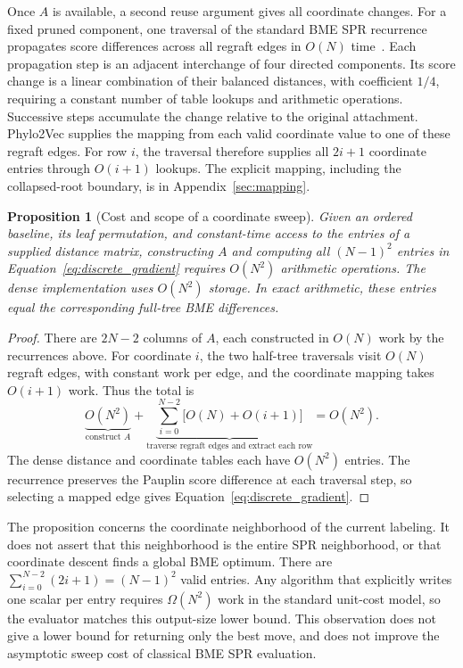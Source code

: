 \documentclass[11pt,a4paper]{article}
\makeatletter
\DeclareRobustCommand{\_}{\ifmmode\nfss@text{\textunderscore}\else\textunderscore\allowbreak\fi}
\newtheorem{proposition}[theorem]{Proposition}
\theoremstyle{definition}
\makeatother
\begin{document}
Once $A$ is available, a second reuse argument gives all coordinate changes.
For a fixed pruned component, one traversal of the standard BME SPR recurrence propagates score differences across all regraft edges in $O(N)$ time~\cite{hordijk2005spr}.
Each propagation step is an adjacent interchange of four directed components.
Its score change is a linear combination of their balanced distances, with coefficient $1/4$, requiring a constant number of table lookups and arithmetic operations.
Successive steps accumulate the change relative to the original attachment.
Phylo2Vec supplies the mapping from each valid coordinate value to one of these regraft edges.
For row $i$, the traversal therefore supplies all $2i+1$ coordinate entries through $O(i+1)$ lookups.
The explicit mapping, including the collapsed-root boundary, is in Appendix~\ref{sec:mapping}.

\begin{proposition}[Cost and scope of a coordinate sweep]
\label{prop:quadratic}
Given an ordered baseline, its leaf permutation, and constant-time access to the entries of a supplied distance matrix, constructing $A$ and computing all $(N-1)^2$ entries in Equation~\eqref{eq:discrete_gradient} requires $O(N^2)$ arithmetic operations.
The dense implementation uses $O(N^2)$ storage.
In exact arithmetic, these entries equal the corresponding full-tree BME differences.
\end{proposition}
\begin{proof}
There are $2N-2$ columns of $A$, each constructed in $O(N)$ work by the recurrences above.
For coordinate $i$, the two half-tree traversals visit $O(N)$ regraft edges, with constant work per edge, and the coordinate mapping takes $O(i+1)$ work.
Thus the total is
\[
 \underbrace{O(N^2)}_{\text{construct }A}
 +\underbrace{\sum_{i=0}^{N-2}\bigl[O(N)+O(i+1)\bigr]}_{\text{traverse regraft edges and extract each row}}
 =O(N^2).
\]
The dense distance and coordinate tables each have $O(N^2)$ entries.
The recurrence preserves the Pauplin score difference at each traversal step, so selecting a mapped edge gives Equation~\eqref{eq:discrete_gradient}.
\end{proof}

The proposition concerns the coordinate neighborhood of the current labeling.
It does not assert that this neighborhood is the entire SPR neighborhood, or that coordinate descent finds a global BME optimum.
There are $\sum_{i=0}^{N-2}(2i+1)=(N-1)^2$ valid entries.
Any algorithm that explicitly writes one scalar per entry requires $\Omega(N^2)$ work in the standard unit-cost model, so the evaluator matches this output-size lower bound.
This observation does not give a lower bound for returning only the best move, and does not improve the asymptotic sweep cost of classical BME SPR evaluation.
\end{document}
